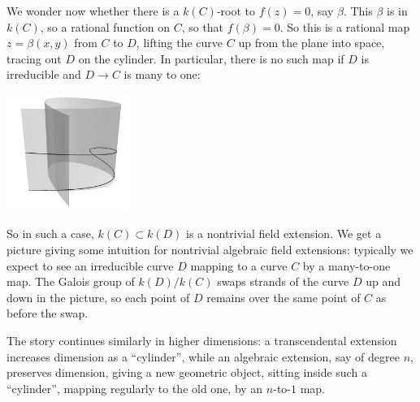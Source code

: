 We wonder now whether there is a \(k(C)\)-root to \(f(z)=0\), say \(\beta\).
This \(\beta\) is in \(k(C)\), so a rational function on \(C\), so that \(f(\beta)=0\).
So this is a rational map \(z=\beta(x,y)\) from \(C\) to \(D\), lifting the curve \(C\) up from the plane into space, tracing out \(D\) on the cylinder.
In particular, there is no such map if \(D\) is irreducible and \(D \to C\) is many to one:
\begin{center}
\includegraphics[width=4cm]{cylinder-on-curve-3}
\end{center}
So in such a case, \(k(C) \subset k(D)\) is a nontrivial field extension.
We get a picture giving some intuition for nontrivial algebraic field extensions: typically we expect to see an irreducible curve \(D\) mapping to a curve \(C\) by a many-to-one map.
The Galois group of \(k(D)/k(C)\) swaps strands of the curve \(D\) up and down in the picture, so each point of \(D\) remains over the same point of \(C\) as before the swap.

The story continues similarly in higher dimensions: a transcendental extension increases dimension as a ``cylinder'', while an algebraic extension, say of degree \(n\), preserves dimension, giving a new geometric object, sitting inside such a ``cylinder'', mapping regularly to the old one, by an \(n\)-to-\(1\) map.

   
